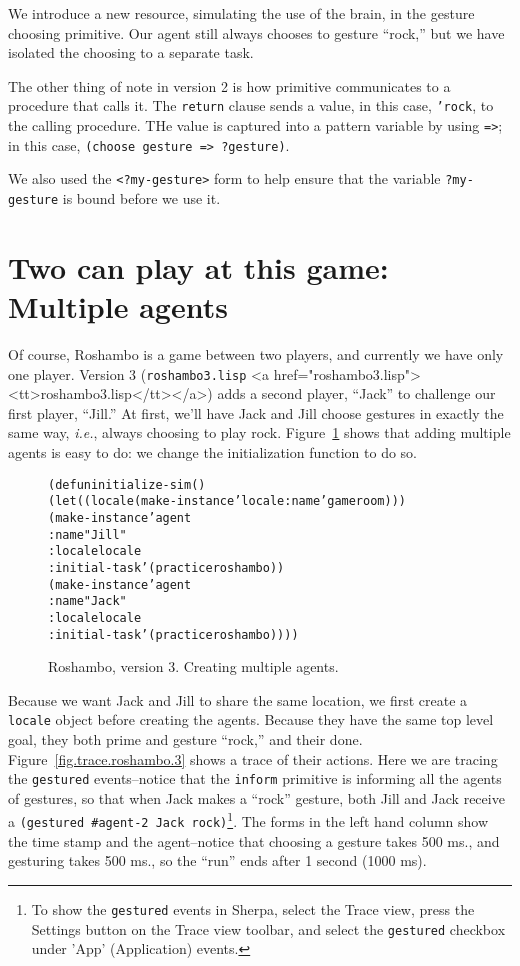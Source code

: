 \documentclass[12pt]{article}
\newcommand{\ic}{\texttt}
\newenvironment{code}%
   {\begin{alltt}}%
   {\end{alltt}}
\newenvironment{float}%
   {\begin{center}}%
   {\end{center}
   }
\newcommand{\fn}[1]{\texonly\texttt{#1}\endtexonly
  \htmlonly \rawhtml <a href="#1"><tt>#1</tt></a>\endrawhtml \endhtmlonly}
\begin{document}
We introduce a new resource, simulating the use of the brain, in the gesture choosing primitive. Our agent still always chooses to gesture ``rock,'' but we have isolated the choosing to a separate task. 

The other thing of note in version 2 is how primitive communicates to a procedure that calls it. The \ic{return} clause sends a value, in this case, \ic{'rock}, to the calling procedure. THe value is captured into a pattern variable by using \ic{=>}; in this case, \ic{(choose gesture => ?gesture)}.

We also used the \ic{<?my-gesture>} form to help ensure that the variable \ic{?my-gesture} is bound before we use it.

\htmlpagebreak
\section{Two can play at this game: Multiple agents}

Of course, Roshambo is a game between two players, and currently we have only one player. Version 3 (\fn{roshambo3.lisp}) adds a second player, ``Jack'' to challenge our first player, ``Jill.'' At first, we'll have Jack and Jill choose gestures in exactly the same way, \textit{i.e.}, always choosing to play rock. Figure~\ref{fig.roshambo.3} shows that adding multiple agents is easy to do: we change the initialization function to do so.

\begin{figure}
\begin{float}
\begin{code}
(defun initialize-sim ()
  (let ((locale (make-instance 'locale :name 'gameroom)))
    (make-instance 'agent
      :name "Jill"
      :locale locale
      :initial-task '(practice roshambo))
    (make-instance 'agent
      :name "Jack"
      :locale locale
      :initial-task '(practice roshambo))))
\end{code}
\end{float}
\caption{Roshambo, version 3. Creating multiple agents.\label{fig.roshambo.3}}
\end{figure}

Because we want Jack and Jill to share the same location, we first create a \ic{locale} object before creating the agents. Because they have the same top level goal, they both prime and  gesture ``rock,'' and their done. Figure~\ref{fig.trace.roshambo.3} shows a trace of their actions. Here we are tracing the \ic{gestured} events--notice that the \ic{inform} primitive is informing all the agents of gestures, so that when Jack makes a ``rock'' gesture, both Jill and Jack receive a \ic{(gestured \#{agent-2 Jack} rock)}\footnote{To show the \ic{gestured} events in Sherpa, select the Trace view, press the Settings button on the Trace view toolbar, and select the \ic{gestured} checkbox under 'App' (Application) events.}. The forms in the left hand column show the time stamp and the agent--notice that choosing a gesture takes 500 ms., and gesturing takes 500 ms., so the ``run'' ends after 1 second (1000 ms).
\end{document}
